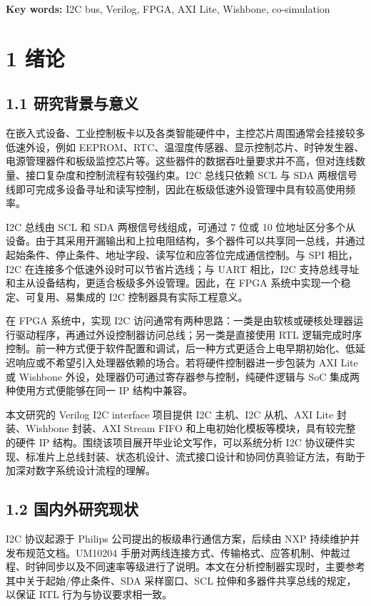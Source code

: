 \textbf{Key words:} I2C bus, Verilog, FPGA, AXI Lite, Wishbone,
co-simulation

\section{1 绪论}\label{ux7eeaux8bba}

\subsection{1.1
研究背景与意义}\label{ux7814ux7a76ux80ccux666fux4e0eux610fux4e49}

在嵌入式设备、工业控制板卡以及各类智能硬件中，主控芯片周围通常会挂接较多低速外设，例如
EEPROM、RTC、温湿度传感器、显示控制芯片、时钟发生器、电源管理器件和板级监控芯片等。这些器件的数据吞吐量要求并不高，但对连线数量、接口复杂度和控制流程有较强约束。I2C
总线只依赖 SCL 与 SDA
两根信号线即可完成多设备寻址和读写控制，因此在板级低速外设管理中具有较高使用频率。

I2C 总线由 SCL 和 SDA 两根信号线组成，可通过 7 位或 10
位地址区分多个从设备。由于其采用开漏输出和上拉电阻结构，多个器件可以共享同一总线，并通过起始条件、停止条件、地址字段、读写位和应答位完成通信控制。与
SPI 相比，I2C 在连接多个低速外设时可以节省片选线；与 UART 相比，I2C
支持总线寻址和主从设备结构，更适合板级多外设管理。因此，在 FPGA
系统中实现一个稳定、可复用、易集成的 I2C 控制器具有实际工程意义。

在 FPGA 系统中，实现 I2C
访问通常有两种思路：一类是由软核或硬核处理器运行驱动程序，再通过外设控制器访问总线；另一类是直接使用
RTL
逻辑完成时序控制。前一种方式便于软件配置和调试，后一种方式更适合上电早期初始化、低延迟响应或不希望引入处理器依赖的场合。若将硬件控制器进一步包装为
AXI Lite 或 Wishbone 外设，处理器仍可通过寄存器参与控制，纯硬件逻辑与
SoC 集成两种使用方式便能够在同一 IP 结构中兼容。

本文研究的 Verilog I2C interface 项目提供 I2C 主机、I2C 从机、AXI Lite
封装、Wishbone 封装、AXI Stream FIFO
和上电初始化模板等模块，具有较完整的硬件 IP
结构。围绕该项目展开毕业论文写作，可以系统分析 I2C
协议硬件实现、标准片上总线封装、状态机设计、流式接口设计和协同仿真验证方法，有助于加深对数字系统设计流程的理解。

\subsection{1.2
国内外研究现状}\label{ux56fdux5185ux5916ux7814ux7a76ux73b0ux72b6}

I2C 协议起源于 Philips 公司提出的板级串行通信方案，后续由 NXP
持续维护并发布规范文档。UM10204
手册对两线连接方式、传输格式、应答机制、仲裁过程、时钟同步以及不同速率等级进行了说明。本文在分析控制器实现时，主要参考其中关于起始/停止条件、SDA
采样窗口、SCL 拉伸和多器件共享总线的规定，以保证 RTL
行为与协议要求相一致。

